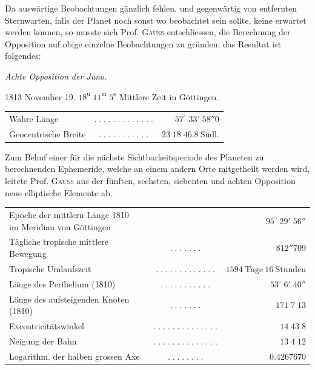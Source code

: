 \par\indent Da auswärtige Beobachtungen gänzlich fehlen, und gegenwärtig von entfernten Sternwarten, falls der Planet noch sonst wo beobachtet sein sollte, keine erwartet werden können, so musste sich Prof. \textsc{Gauss} entschliessen, die Berechnung der Opposition auf obige einzelne Beobachtungen zu gründen; das Resultat ist folgendes:
\begin{center}\leavevmode{}\emph{Achte Opposition der Juno.}\end{center}
\begin{center}1813 November 19. $18^{\mathrm u}\;11^{\mathrm m}\;5^{\mathrm s}$ Mittlere Zeit in Göttingen.\end{center}
\begin{center}\fontsize{10}{12}\selectfont\setlength{\tabcolsep}{2pt}\renewcommand{\arraystretch}{1.15}\begin{tabular}{lcr}
Wahre Länge & $.\;.\;.\;.\;.\;.\;.\;.\;.\;.\;.\;.\;.$ & $57^\circ\;33'\;58''0$\\
Geocentrische Breite & $.\;.\;.\;.\;.\;.\;.\;.\;.\;.\;.$ & $23\;18\;46.8\ \text{Südl.}$\\
\end{tabular}\end{center}
\par\indent Zum Behuf einer für die nächste Sichtbarkeitsperiode des Planeten zu berechnenden Ephemeride, welche an einem andern Orte mitgetheilt werden wird, leitete Prof. \textsc{Gauss} aus der fünften, sechsten, siebenten und achten Opposition neue elliptische Elemente ab.
\begin{center}\fontsize{9}{11}\selectfont\setlength{\tabcolsep}{2pt}\renewcommand{\arraystretch}{1.15}\begin{tabular}{lcr}
\shortstack[l]{Epoche der mittlern Länge 1810\\im Meridian von Göttingen} &  & $95^\circ\;29'\;56''$\\
Tägliche tropische mittlere Bewegung & $.\;.\;.\;.\;.\;.\;.$ & $812''709$\\
Tropische Umlaufszeit & $.\;.\;.\;.\;.\;.\;.\;.\;.\;.\;.\;.\;.$ & $1594\ \text{Tage}\ 16\ \text{Stunden}$\\
Länge des Perihelium (1810) & $.\;.\;.\;.\;.\;.\;.\;.\;.\;.\;.$ & $53^\circ\;6'\;40''$\\
Länge des aufsteigenden Knoten (1810) & $.\;.\;.\;.\;.\;.\;.$ & $171\;7\;13$\\
Excentricitätswinkel & $.\;.\;.\;.\;.\;.\;.\;.\;.\;.\;.\;.\;.\;.$ & $14\;43\;8$\\
Neigung der Bahn & $.\;.\;.\;.\;.\;.\;.\;.\;.\;.\;.\;.\;.\;.$ & $13\;4\;12$\\
Logarithm. der halben grossen Axe & $.\;.\;.\;.\;.\;.\;.\;.$ & $0.4267670$\\
\end{tabular}\end{center}
